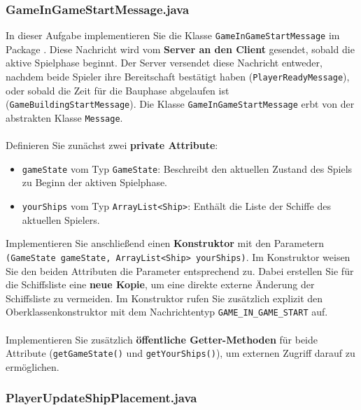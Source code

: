 \documentclass[12pt]{article}
\begin{document}
\subsubsection*{GameInGameStartMessage.java}

In dieser Aufgabe implementieren Sie die Klasse \texttt{GameInGameStartMessage} im Package . 
Diese Nachricht wird vom \textbf{Server an den Client} gesendet, sobald die aktive Spielphase beginnt. 
Der Server versendet diese Nachricht entweder, nachdem beide Spieler ihre Bereitschaft bestätigt haben (\texttt{PlayerReadyMessage}), 
oder sobald die Zeit für die Bauphase abgelaufen ist (\texttt{GameBuildingStartMessage}). 
Die Klasse \texttt{GameInGameStartMessage} erbt von der abstrakten Klasse \texttt{Message}.
\\ \\ 
Definieren Sie zunächst zwei \textbf{private Attribute}:
\begin{itemize}
    \item \texttt{gameState} vom Typ \texttt{GameState}: Beschreibt den aktuellen Zustand des Spiels zu Beginn der aktiven Spielphase.
    \item \texttt{yourShips} vom Typ \texttt{ArrayList\hspace{0pt}<Ship>}: Enthält die Liste der Schiffe des aktuellen Spielers.
\end{itemize}
Implementieren Sie anschließend einen \textbf{Konstruktor} mit den Parametern \texttt{(GameState gameState, ArrayList<Ship> yourShips)}. 
Im Konstruktor weisen Sie den beiden Attributen die Parameter entsprechend zu. Dabei erstellen Sie für die Schiffsliste eine \textbf{neue Kopie}, 
um eine direkte externe Änderung der Schiffsliste zu vermeiden. 
Im Konstruktor rufen Sie zusätzlich explizit den Oberklassenkonstruktor mit dem Nachrichtentyp \texttt{GAME\_IN\_GAME\_START} auf.
\\ \\ 
Implementieren Sie zusätzlich \textbf{öffentliche Getter-Methoden} für beide Attribute (\texttt{getGame\hspace{0pt}State()} und \texttt{getYour\hspace{0pt}Ships()}), 
um externen Zugriff darauf zu ermöglichen.

\subsubsection*{PlayerUpdateShipPlacement.java}
\end{document}
